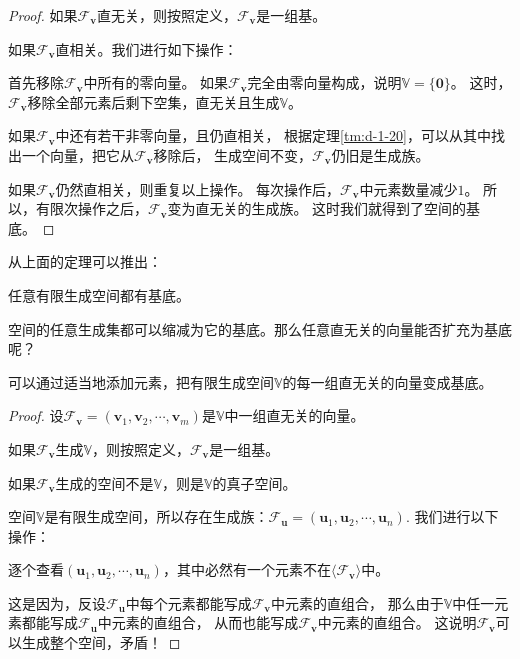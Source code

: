 \documentclass[12pt,UTF8]{ctexbook}
\begin{document}
\begin{appendix}
\begin{proof}
    如果$\mathcal{F}_{\mathbf{v}}$直无关，则按照定义，$\mathcal{F}_{\mathbf{v}}$是一组基。

    如果$\mathcal{F}_{\mathbf{v}}$直相关。我们进行如下操作：

    首先移除$\mathcal{F}_{\mathbf{v}}$中所有的零向量。
    如果$\mathcal{F}_{\mathbf{v}}$完全由零向量构成，说明$\mathbb{V} = \{\mathbf{0}\}$。
    这时，$\mathcal{F}_{\mathbf{v}}$移除全部元素后剩下空集，直无关且生成$\mathbb{V}$。

    如果$\mathcal{F}_{\mathbf{v}}$中还有若干非零向量，且仍直相关，
    根据定理\ref{tm:d-1-20}，可以从其中找出一个向量，把它从$\mathcal{F}_{\mathbf{v}}$移除后，
    生成空间不变，$\mathcal{F}_{\mathbf{v}}$仍旧是生成族。

    如果$\mathcal{F}_{\mathbf{v}}$仍然直相关，则重复以上操作。
    每次操作后，$\mathcal{F}_{\mathbf{v}}$中元素数量减少$1$。
    所以，有限次操作之后，$\mathcal{F}_{\mathbf{v}}$变为直无关的生成族。
    这时我们就得到了空间的基底。

\end{proof}

从上面的定理可以推出：
\begin{tm}\label{tm:d-1-50}
    任意有限生成空间都有基底。
\end{tm}

空间的任意生成集都可以缩减为它的基底。那么任意直无关的向量能否扩充为基底呢？
\begin{tm}\label{tm:d-1-60}
    可以通过适当地添加元素，把有限生成空间$\mathbb{V}$的每一组直无关的向量变成基底。
\end{tm}

\begin{proof}
    设$\mathcal{F}_{\mathbf{v}} = (\mathbf{v}_1, \mathbf{v}_2, \cdots , \mathbf{v}_m )$是$\mathbb{V}$中一组直无关的向量。

    如果$\mathcal{F}_{\mathbf{v}}$生成$\mathbb{V}$，则按照定义，$\mathcal{F}_{\mathbf{v}}$是一组基。

    如果$\mathcal{F}_{\mathbf{v}}$生成的空间不是$\mathbb{V}$，则是$\mathbb{V}$的真子空间。

    空间$\mathbb{V}$是有限生成空间，所以存在生成族：$\mathcal{F}_{\mathbf{u}} = (\mathbf{u}_1, \mathbf{u}_2, \cdots , \mathbf{u}_n )$. 我们进行以下操作：

    逐个查看$(\mathbf{u}_1, \mathbf{u}_2, \cdots , \mathbf{u}_n )$，其中必然有一个元素不在$\langle\mathcal{F}_{\mathbf{v}}\rangle$中。

    这是因为，反设$\mathcal{F}_{\mathbf{u}}$中每个元素都能写成$\mathcal{F}_{\mathbf{v}}$中元素的直组合，
    那么由于$\mathbb{V}$中任一元素都能写成$\mathcal{F}_{\mathbf{u}}$中元素的直组合，
    从而也能写成$\mathcal{F}_{\mathbf{v}}$中元素的直组合。
    这说明$\mathcal{F}_{\mathbf{v}}$可以生成整个空间，矛盾！


\end{proof}
\end{appendix}
\end{document}
